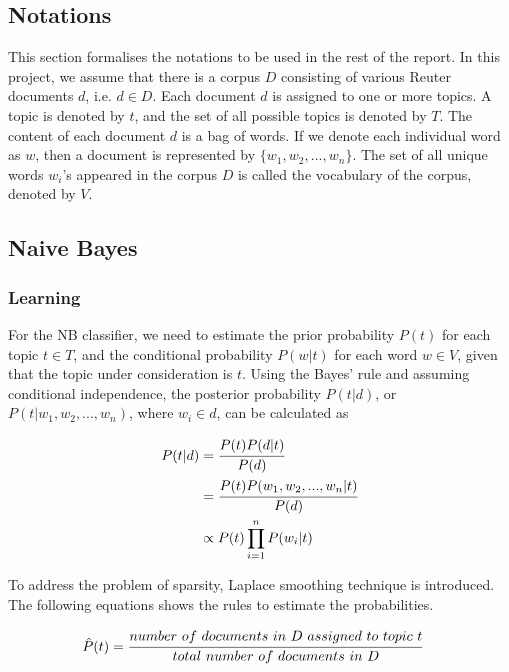 \documentclass[11pt]{article}
\begin{document}
\subsection{Notations}
This section formalises the notations to be used in the rest of the report.
In this project, we assume that there is a corpus $D$ consisting of various Reuter documents $d$, i.e. $d\in D$.
Each document $d$ is assigned to one or more topics.
A topic is denoted by $t$, and the set of all possible topics is denoted by $T$.
The content of each document $d$ is a bag of words.
If we denote each individual word as $w$, then a document is represented by $\{w_1, w_2, ..., w_n\}$.
The set of all unique words $w_i$'s appeared in the corpus $D$ is called the vocabulary of the corpus, denoted by $V$.


\subsection{Naive Bayes}

\subsubsection*{Learning}
For the NB classifier, we need to estimate the prior probability $P(t)$ for each topic $t\in T$, and the conditional probability $P(w|t)$ for each word $w \in V$, given that the topic under consideration is $t$.
Using the Bayes' rule and assuming conditional independence, the posterior probability $P(t|d)$, or $P(t|w_1, w_2, ..., w_n)$, where $w_i\in d$, can be calculated as

\begin{equation}
    \label{eq:nb-bayes}
    \begin{split}
        P(t|d) & = \cfrac{P(t)P(d|t)}{P(d)} \\
            & = \cfrac{P(t)P(w_1, w_2, ..., w_n|t)}{P(d)} \\
            & \propto P(t)\prod\limits_{i=1}^n P(w_i|t)
    \end{split}        
\end{equation}

To address the problem of sparsity, Laplace smoothing technique is introduced.
The following equations shows the rules to estimate the probabilities.

\begin{equation}
    \label{eq:nb-prior}
    \begin{split}
        \hat{P}(t) & = \cfrac{number\ of\ documents\ in\ D\ assigned\ to\ topic\ t}{total\ number\ of\ documents\ in\ D}
    \end{split}
\end{equation}
\end{document}
